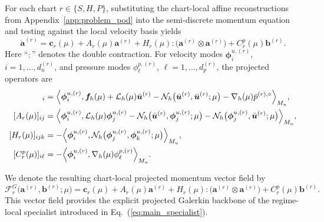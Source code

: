 \documentclass{article}
\def\plaineqref#1{\ref{#1}}
\begin{document}
For each chart $r\in\{S,H,P\}$, substituting the chart-local affine reconstructions
from Appendix~\ref{app:problem_pod} into the semi-discrete
momentum equation and testing against the local velocity basis yields
\begin{equation}
    \dot{\bm a}^{(r)}
    =
    \bm c_r(\mu)
    +
    A_r(\mu)\bm a^{(r)}
    +
    H_r(\mu):
    \bigl(
        \bm a^{(r)}\otimes\bm a^{(r)}
    \bigr)
    +
    C_r^p(\mu)\bm b^{(r)}.
    \label{eq:app_projected_momentum}
\end{equation}
Here ``$:$'' denotes the double contraction.
For velocity modes
$\bm\phi_i^{u,(r)}$,
$i=1,\ldots,d_u^{(r)}$,
and pressure modes
$\phi_\ell^{p,(r)}$,
$\ell=1,\ldots,d_p^{(r)}$,
the projected operators are
\begin{align}
    [\bm c_r(\mu)]_i
    &=
    \Bigl\langle
        \bm\phi_i^{u,(r)},
        \bm f_h(\mu)
        +
        \mathcal L_h(\mu)\bar{\bm u}^{(r)}
        -
        \mathcal N_h
        \bigl(
            \bar{\bm u}^{(r)},
            \bar{\bm u}^{(r)};
            \mu
        \bigr)
        -
        \nabla_h(\mu)\bar p^{(r),\circ}
    \Bigr\rangle_{M_u},
    \\
    [A_r(\mu)]_{ij}
    &=
    \Bigl\langle
        \bm\phi_i^{u,(r)},
        \mathcal L_h(\mu)\bm\phi_j^{u,(r)}
        -
        \mathcal N_h
        \bigl(
            \bar{\bm u}^{(r)},
            \bm\phi_j^{u,(r)};
            \mu
        \bigr)
        -
        \mathcal N_h
        \bigl(
            \bm\phi_j^{u,(r)},
            \bar{\bm u}^{(r)};
            \mu
        \bigr)
    \Bigr\rangle_{M_u},
    \\
    [H_r(\mu)]_{ijk}
    &=
    -
    \Bigl\langle
        \bm\phi_i^{u,(r)},
        \mathcal N_h
        \bigl(
            \bm\phi_j^{u,(r)},
            \bm\phi_k^{u,(r)};
            \mu
        \bigr)
    \Bigr\rangle_{M_u},
    \\
    [C_r^p(\mu)]_{i\ell}
    &=
    -
    \Bigl\langle
        \bm\phi_i^{u,(r)},
        \nabla_h(\mu)\phi_\ell^{p,(r)}
    \Bigr\rangle_{M_u}.
    \label{eq:app_projected_operators}
\end{align}

We denote the resulting chart-local projected momentum vector field by
\begin{equation}
    \mathcal F_r^G
    \bigl(
        \bm a^{(r)},
        \bm b^{(r)};
        \mu
    \bigr)
    =
    \bm c_r(\mu)
    +
    A_r(\mu)\bm a^{(r)}
    +
    H_r(\mu):
    \bigl(
        \bm a^{(r)}\otimes\bm a^{(r)}
    \bigr)
    +
    C_r^p(\mu)\bm b^{(r)}.
    \label{eq:app_galerkin_backbone}
\end{equation}
This vector field provides the explicit projected Galerkin backbone of the
regime-local specialist introduced in
Eq.~(\plaineqref{eq:main_specialist}).
\end{document}
